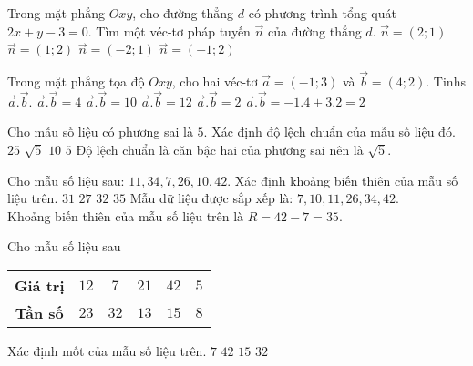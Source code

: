 \begin{ex}%
	Trong mặt phẳng $Oxy$, cho đường thẳng $d$ có phương trình tổng quát $2x+y-3=0$. Tìm một véc-tơ pháp tuyến $\vec{n}$ của đường thẳng $d$.
	\choice
	{\True $\vec{n}=(2;1)$}
	{$\vec{n}=(1;2)$}
	{$\vec{n}=(-2;1)$}
	{$\vec{n}=(-1;2)$}
\end{ex}
\begin{ex}%
 	Trong mặt phẳng tọa độ $Oxy$, cho hai véc-tơ $\vec{a}=\left(-1;3\right)$ và $\vec{b}=\left(4;2\right)$. Tinhs $\vec{a}.\vec{b}$.
 	\choice
 	{$\vec{a}.\vec{b}=4$}
 	{$\vec{a}.\vec{b}=10$}
 	{$\vec{a}.\vec{b}=12$}
 	{\True $\vec{a}.\vec{b}=2$}
 	\loigiai
 	{
 		$\vec{a}.\vec{b}=-1.4+3.2=2$
 	}
\end{ex}
\begin{ex}%
	Cho mẫu số liệu có phương sai là $5$. Xác định độ lệch chuẩn của mẫu số liệu đó.
	\choice
	{$25$}
	{\True $\sqrt{5}$}
	{$10$}
	{$5$}
	\loigiai
	{
		Độ lệch chuẩn là căn bậc hai của phương sai nên là $\sqrt{5}$.
	}
\end{ex}
\begin{ex}%
	Cho mẫu số liệu sau: $11,34,7,26,10,42$. Xác định khoảng biến thiên của mẫu số liệu trên.
	\choice
	{$31$}
	{$27$}
	{$32$}
	{\True $35$}
	\loigiai
	{
		Mẫu dữ liệu được sắp xếp là: $7,10,11,26,34,42$.\\
		Khoảng biến thiên của mẫu số liệu trên là $R=42-7=35$.
	}
\end{ex}

\begin{ex}%
	Cho mẫu số liệu sau
	\begin{center}
		\begin{tabular}{|c|c|c|c|c|c|}
			\hline
			\textbf{Giá trị} & $12$ & $7$ & $21$ & $42$ & $5$\\
			\hline
			\textbf{Tần số} & $23$ & $32$ & $13$ & $15$ & $8$\\
			\hline
		\end{tabular}
	\end{center}
	Xác định mốt của mẫu số liệu trên.
	\choice
	{\True $7$}
	{$42$}
	{$15$}
	{$32$}
\end{ex}

